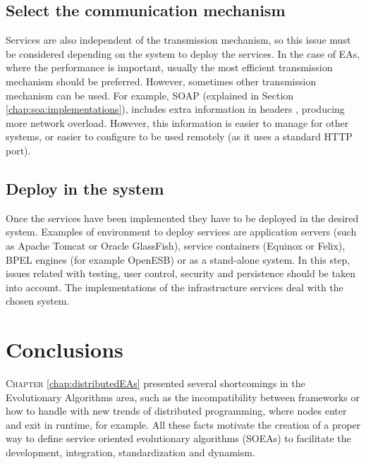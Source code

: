 \subsection{Select the communication mechanism}
Services are also independent of the transmission mechanism, so this issue must be considered depending on the system to deploy the services. In the case of EAs, where the performance is important, usually the most efficient transmission mechanism should be preferred. However, sometimes other transmission mechanism can be used. For example, SOAP (explained in Section \ref{chap:soa:implementations}), includes extra information in headers \cite{Castillo13SOAP}, producing more network overload. However, this information is easier to manage for other systems, or easier to configure to be used remotely (as it uses a standard HTTP port).

\subsection{Deploy in the system} 
Once the services have been implemented they have to be deployed in the desired system. Examples of environment to deploy services are application servers (such as Apache Tomcat or Oracle GlassFish), service containers (Equinox or Felix), BPEL engines (for example OpenESB) or as a stand-alone system. In this step, issues related with testing, user control, security and persistence should be taken into account. The implementations of the infrastructure services deal with the chosen system.












\section{Conclusions}

\lettrine{C}{hapter} \ref{chap:distributedEAs} presented several shortcomings in the Evolutionary Algorithms area, such as the  incompatibility between frameworks or how to handle with new trends of distributed programming, where nodes enter and exit in runtime, for example. All these facts  motivate the creation of a proper way to define service oriented evolutionary algorithms (SOEAs) to facilitate the development, integration, standardization and dynamism.

